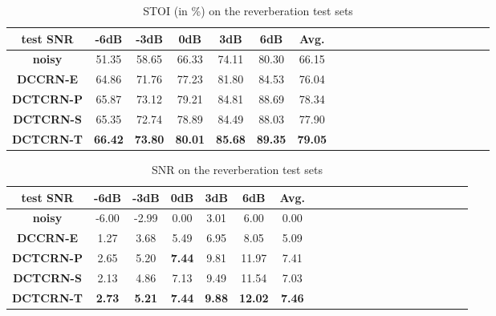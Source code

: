 \documentclass[journal,10pt]{IEEEtran}
\begin{document}
\begin{table}[!t]  \centering
\small
\caption{STOI (in \%) on the reverberation test sets}
\label{tab:stoir}
\setlength{\tabcolsep}{1.7mm}
\begin{tabular}{c<{\centering}|c<{\centering}c<{\centering}c<{\centering}c<{\centering}c<{\centering}c<{\centering}c<{\centering}c<{\centering}c<{\centering}c<{\centering}|c<{\centering}c<{\centering}c<{\centering}c<{\centering}c<{\centering}c<{\centering}c<{\centering}c<{\centering}c<{\centering}c<{\centering}}
\hline
\hline
\textbf{test SNR} & \textbf{-6dB} & \textbf{-3dB} & \textbf{0dB} & \textbf{3dB} & \textbf{6dB} & \textbf{Avg.} \\
\hline
\hline
\textbf{noisy}     & 51.35 & 58.65 & 66.33 & 74.11 & 80.30 & 66.15 \\
\textbf{DCCRN-E}   & 64.86 & 71.76 & 77.23 & 81.80 & 84.53 & 76.04 \\
\textbf{DCTCRN-P}  & 65.87 & 73.12 & 79.21 & 84.81 & 88.69 & 78.34 \\
\textbf{DCTCRN-S}  & 65.35 & 72.74 & 78.89 & 84.49 & 88.03 & 77.90 \\
\textbf{DCTCRN-T}  & \textbf{66.42} & \textbf{73.80} & \textbf{80.01} & \textbf{85.68} & \textbf{89.35} & \textbf{79.05} \\
\hline
\hline
\end{tabular}
\end{table}

\begin{table}[!t]  \centering
\small
\caption{SNR on the reverberation test sets}
\label{tab:snrr}
\setlength{\tabcolsep}{1.7mm}
\begin{tabular}{c<{\centering}|c<{\centering}c<{\centering}c<{\centering}c<{\centering}c<{\centering}c<{\centering}c<{\centering}c<{\centering}c<{\centering}c<{\centering}|c<{\centering}c<{\centering}c<{\centering}c<{\centering}c<{\centering}c<{\centering}c<{\centering}c<{\centering}c<{\centering}c<{\centering}}
\hline
\hline
\textbf{test SNR} & \textbf{-6dB} & \textbf{-3dB} & \textbf{0dB} & \textbf{3dB} & \textbf{6dB} & \textbf{Avg.} \\
\hline
\hline
\textbf{noisy}    & -6.00 & -2.99 & 0.00 & 3.01 & 6.00 & 0.00 \\
\textbf{DCCRN-E}  & 1.27 & 3.68 & 5.49 & 6.95 & 8.05 & 5.09 \\
\textbf{DCTCRN-P} & 2.65 & 5.20 & \textbf{7.44} & 9.81 & 11.97 & 7.41 \\
\textbf{DCTCRN-S} & 2.13 & 4.86 & 7.13 & 9.49 & 11.54 & 7.03 \\
\textbf{DCTCRN-T} & \textbf{2.73} & \textbf{5.21} & \textbf{7.44} & \textbf{9.88} & \textbf{12.02} & \textbf{7.46} \\
\hline
\hline
\end{tabular}
\end{table}
\end{document}
